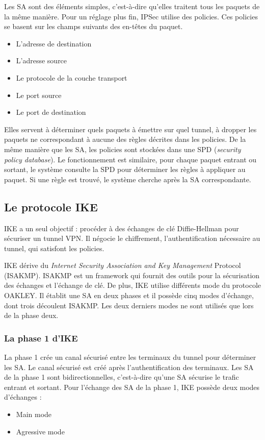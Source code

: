 Les SA sont des éléments simples, c'est-à-dire qu'elles traitent tous les paquets de la même manière. 
Pour un réglage plus fin, IPSec utilise des policies. 
Ces policies se basent sur les champs suivants des en-têtes du paquet.
\begin{itemize}
\item L'adresse de destination
\item L'adresse source
\item Le protocole de la couche transport
\item Le port source
\item Le port de destination
\end{itemize}
Elles servent à déterminer quels paquets à émettre sur quel tunnel, à dropper les paquets ne correspondant à aucune des règles décrites dans les policies. 
De la même manière que les SA, les policies sont stockées dans une SPD (\textit{security policy database}). 
Le fonctionnement est similaire, pour chaque paquet entrant ou sortant, le système consulte la SPD pour déterminer les règles à appliquer au paquet. Si une règle est trouvé, le système cherche après la SA correspondante.

\subsection{Le protocole IKE}
IKE a un seul objectif : procéder à des échanges de clé Diffie-Hellman pour sécuriser un tunnel VPN. 
Il négocie le chiffrement, l'authentification nécessaire au tunnel, qui satisfont les policies. 

IKE dérive du \textit{Internet Security Association and Key Management} Protocol (ISAKMP). 
ISAKMP est un framework qui fournit des outils pour la sécurisation des échanges et l'échange de clé. 
De plus, IKE utilise différents mode du protocole OAKLEY.
Il établit une SA en deux phases et il possède cinq modes d'échange, dont trois découlent ISAKMP.
Les deux derniers modes ne sont utilisés que lors de la phase deux.

\subsubsection{La phase 1 d'IKE}
La phase 1 crée un canal sécurisé entre les terminaux du tunnel pour déterminer les SA. Le canal sécurisé est créé après l'authentification des terminaux. Les SA de la phase 1 sont bidirectionnelles, c'est-à-dire qu'une SA sécurise le trafic entrant et sortant. 
Pour l'échange des SA de la phase 1, IKE possède deux modes d'échanges : 
\begin{itemize}
	\item Main mode
	\item Agressive mode
\end{itemize}

